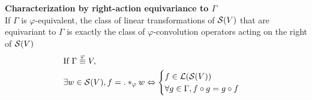 \begin{proposition}\textbf{Characterization by right-action equivariance to $\Gamma$}\\
If $\Gamma$ is $\varphi$-equivalent, the class of linear transformations of $\mathcal{S}(V)$ that are equivariant to $\Gamma$ is exactly the class of $\varphi$-convolution operators acting on the right of $\mathcal{S}(V)$ \ie
\begin{align*}
& \text{If } \Gamma \overset{\varphi}{\equiv} V,\\
& \exists w \in \mathcal{S}(V), f = . \ast_{\varphi} w \Leftrightarrow
\begin{cases}
f \in \mathcal{L}(\mathcal{S}(V))\\
\forall g \in \Gamma, f \circ g = g \circ f
\end{cases}
\end{align*}
\label{prop:equiG}
\end{proposition}

